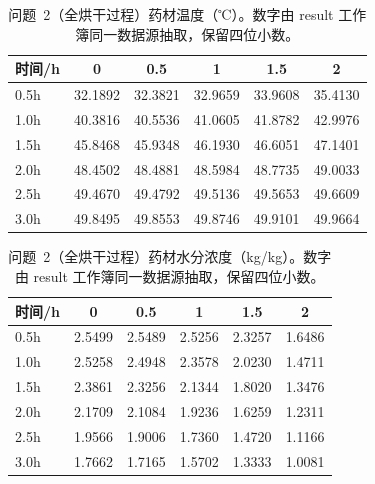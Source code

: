 \begin{table}[htbp]
\centering
\caption{问题~2（全烘干过程）药材温度（℃）。数字由 result 工作簿同一数据源抽取，保留四位小数。}
\label{tab:表3}
\small
\begin{tabular}{lccccc}
\toprule
时间/h & 0 & 0.5 & 1 & 1.5 & 2 \\
\midrule
0.5h & 32.1892 & 32.3821 & 32.9659 & 33.9608 & 35.4130 \\
1.0h & 40.3816 & 40.5536 & 41.0605 & 41.8782 & 42.9976 \\
1.5h & 45.8468 & 45.9348 & 46.1930 & 46.6051 & 47.1401 \\
2.0h & 48.4502 & 48.4881 & 48.5984 & 48.7735 & 49.0033 \\
2.5h & 49.4670 & 49.4792 & 49.5136 & 49.5653 & 49.6609 \\
3.0h & 49.8495 & 49.8553 & 49.8746 & 49.9101 & 49.9664 \\
\bottomrule
\end{tabular}
\end{table}

\begin{table}[htbp]
\centering
\caption{问题~2（全烘干过程）药材水分浓度（kg/kg）。数字由 result 工作簿同一数据源抽取，保留四位小数。}
\label{tab:表4}
\small
\begin{tabular}{lccccc}
\toprule
时间/h & 0 & 0.5 & 1 & 1.5 & 2 \\
\midrule
0.5h & 2.5499 & 2.5489 & 2.5256 & 2.3257 & 1.6486 \\
1.0h & 2.5258 & 2.4948 & 2.3578 & 2.0230 & 1.4711 \\
1.5h & 2.3861 & 2.3256 & 2.1344 & 1.8020 & 1.3476 \\
2.0h & 2.1709 & 2.1084 & 1.9236 & 1.6259 & 1.2311 \\
2.5h & 1.9566 & 1.9006 & 1.7360 & 1.4720 & 1.1166 \\
3.0h & 1.7662 & 1.7165 & 1.5702 & 1.3333 & 1.0081 \\
\bottomrule
\end{tabular}
\end{table}

